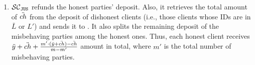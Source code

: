 \begin{enumerate}
\begin{enumerate}
   \item  $\mathcal{SC}_{\mathtt{JUS}}$  refunds the honest parties' deposit. Also, it retrieves the total amount of  $\ddot{ch}$ from the deposit of dishonest clients (i.e., those clients whose IDs are in $\bar L$ or $L'$) and sends it to \aud.  It also splits the remaining deposit of the misbehaving parties among the honest ones. Thus, each honest client  receives $\ddot{y}+\ddot{ch}+\frac{m'\cdot (\ddot{y}+\ddot{ch})-\ddot{ch}}{m-m'}$ amount in total, where $m'$ is the total number of misbehaving parties.
 
 
  \end{enumerate}
  
% 
%  
% 
% 
%  
 
% 
 


\end{enumerate}
